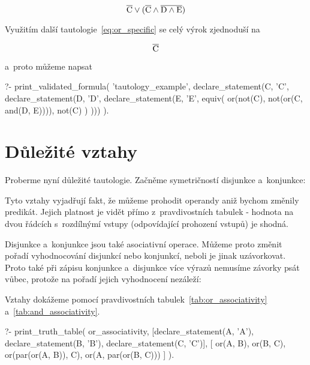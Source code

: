 \begin{equation}
\overline{\mathrm{C}} \lor (\overline{\mathrm{C}} \land \overline{\mathrm{D} \land \mathrm{E}})
\end{equation}

Využitím další tautologie~\eqref{eq:or_specific} se celý výrok zjednoduší na

\begin{equation}
\overline{\mathrm{C}}
\end{equation}

a~proto můžeme napsat

\begin{prolog}
?- print_validated_formula(
	'tautology_example',
	declare_statement(C, 'C', declare_statement(D, 'D', declare_statement(E, 'E',
		equiv(
			or(not(C), not(or(C, and(D, E)))),
			not(C)
		)
	)))
).
\end{prolog}

\section{Důležité vztahy}

Proberme nyní důležité tautologie. Začněme symetričností disjunkce a~konjunkce:


Tyto vztahy vyjadřují fakt, že můžeme prohodit operandy aniž bychom změnily predikát. Jejich platnost je vidět přímo z~pravdivostních tabulek - hodnota na dvou řádcích s~rozdílnýmí vstupy (odpovídající prohození vstupů) je shodná.

Disjunkce a~konjunkce jsou také asociativní operace. Můžeme proto změnit pořadí vyhodnocování disjunkcí nebo konjunkcí, neboli je jinak uzávorkovat. Proto také při zápisu konjunkce a~disjunkce více výrazů nemusíme závorky psát vůbec, protože na pořadí jejich vyhodnocení nezáleží:


Vztahy dokážeme pomocí pravdivostních tabulek~\ref{tab:or_associativity} a~\ref{tab:and_associativity}.

\begin{prolog}
?- print_truth_table(
	or_associativity,
	[declare_statement(A, 'A'), declare_statement(B, 'B'), declare_statement(C, 'C')],
	[
		or(A, B),
		or(B, C),
		or(par(or(A, B)), C),
		or(A, par(or(B, C)))
	]
).
\end{prolog}

